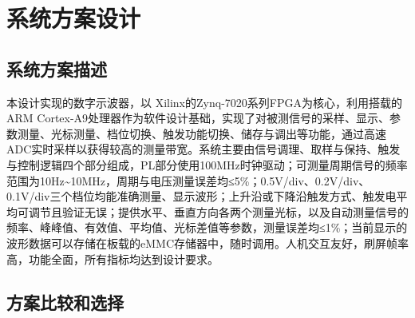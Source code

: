 \documentclass[supercite]{HustGraduPaper}
\begin{document}
	\tableofcontents
	
	\clearpage%
	
	\section{系统方案设计}
	\subsection{系统方案描述}
	
	本设计实现的数字示波器，以 Xilinx的Zynq-7020系列FPGA为核心，利用搭载的ARM Cortex-A9处理器作为软件设计基础，实现了对被测信号的采样、显示、参数测量、光标测量、档位切换、触发功能切换、储存与调出等功能，通过高速ADC实时采样以获得较高的测量带宽。系统主要由信号调理、取样与保持、触发与控制逻辑四个部分组成，PL部分使用100MHz时钟驱动；可测量周期信号的频率范围为10Hz\textasciitilde10MHz，周期与电压测量误差均≤5\%；0.5V/div、0.2V/div、0.1V/div三个档位均能准确测量、显示波形；上升沿或下降沿触发方式、触发电平均可调节且验证无误；提供水平、垂直方向各两个测量光标，以及自动测量信号的频率、峰峰值、有效值、平均值、光标差值等参数，测量误差均≤1\%；当前显示的波形数据可以存储在板载的eMMC存储器中，随时调用。人机交互友好，刷屏帧率高，功能全面，所有指标均达到设计要求。
	
	\subsection{方案比较和选择}
	
\end{document}
